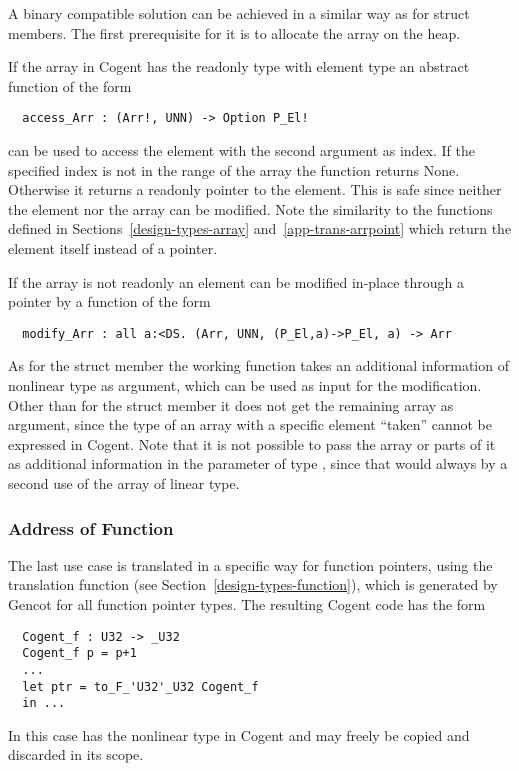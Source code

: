 A binary compatible solution can be achieved in a similar way as for struct members. The first prerequisite for it is
to allocate the array on the heap.

If the array in Cogent has the readonly type  with element type  an abstract function of the form
\begin{verbatim}
  access_Arr : (Arr!, UNN) -> Option P_El!
\end{verbatim}
can be used to access the element with the second argument as index.  If the specified index is not in the range of the array the
function returns None. Otherwise it returns a readonly pointer to the element. This is safe 
since neither the element nor the array can be modified. Note the similarity to the  functions defined in
Sections~\ref{design-types-array} and~\ref{app-trans-arrpoint} which return the element itself instead of a pointer.

If the array is not readonly an element can be modified in-place through a pointer by a function of the form
\begin{verbatim}
  modify_Arr : all a:<DS. (Arr, UNN, (P_El,a)->P_El, a) -> Arr
\end{verbatim}
As for the struct member the working function takes an additional information of nonlinear type as argument, which can be
used as input for the modification. Other than for the struct member it does not get the remaining array as argument,
since the type of an array with a specific element ``taken'' cannot be expressed in Cogent. Note that it is not possible
to pass the array or parts of it as additional information in the parameter of type , since that would always by
a second use of the array of linear type.

\subsubsection{Address of Function}

The last use case is translated in a specific way for function pointers, using the translation function
 (see Section~\ref{design-types-function}), which is generated by Gencot for all function
pointer types. The resulting Cogent code has the form
\begin{verbatim}
  Cogent_f : U32 -> _U32
  Cogent_f p = p+1
  ...
  let ptr = to_F_'U32'_U32 Cogent_f
  in ...
\end{verbatim}
In this case  has the nonlinear type  in Cogent and may freely be copied and
discarded in its scope.

